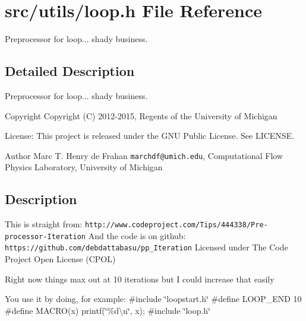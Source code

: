 \section{src/utils/loop.h File Reference}
\label{loop_8h}


Preprocessor for loop... shady business.  




\subsection{Detailed Description}
Preprocessor for loop... shady business. \begin{DoxyCopyright}{Copyright}
Copyright (C) 2012-\/2015, Regents of the University of Michigan 
\end{DoxyCopyright}
\begin{DoxyParagraph}{License\-:}
This project is released under the G\-N\-U Public License. See L\-I\-C\-E\-N\-S\-E. 
\end{DoxyParagraph}
\begin{DoxyAuthor}{Author}
Marc T. Henry de Frahan {\tt marchdf@umich.\-edu}, Computational Flow Physics Laboratory, University of Michigan 
\end{DoxyAuthor}
\subsection{Description}\label{scalar__def_8h_Description}
This is straight from\-: {\tt http\-://www.\-codeproject.\-com/\-Tips/444338/\-Pre-\/processor-\/\-Iteration} And the code is on github\-: {\tt https\-://github.\-com/debdattabasu/pp\-\_\-\-Iteration} Licensed under The Code Project Open License (C\-P\-O\-L)

Right now things max out at 10 iterations but I could increase that easily

You use it by doing, for example\-: \#include \char`\"{}loopstart.\-h\char`\"{} \#define L\-O\-O\-P\-\_\-\-E\-N\-D 10 \#define M\-A\-C\-R\-O(x) printf(\char`\"{}\%d\textbackslash{}n\char`\"{}, x); \#include \char`\"{}loop.\-h\char`\"{} 